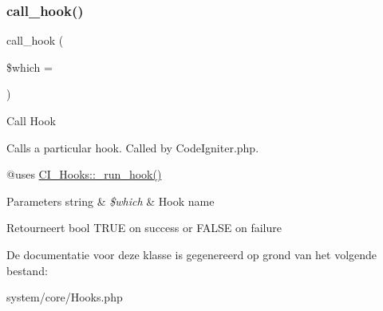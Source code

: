\subsubsection{\texorpdfstring{call\_hook()}{call\_hook()}}
{\footnotesize\ttfamily call\+\_\+hook (\begin{DoxyParamCaption}\item[{}]{\$which = {\ttfamily \textquotesingle{}\textquotesingle{}} }\end{DoxyParamCaption})}

Call Hook

Calls a particular hook. Called by Code\+Igniter.\+php.

@uses \mbox{\hyperlink{class_c_i___hooks_a2cd07b3fcfaf153a37f164d3fbc7c3d9}{C\+I\+\_\+\+Hooks\+::\+\_\+run\+\_\+hook()}}


\begin{DoxyParams}[1]{Parameters}
string & {\em \$which} & Hook name \\
\hline
\end{DoxyParams}
\begin{DoxyReturn}{Retourneert}
bool T\+R\+UE on success or F\+A\+L\+SE on failure 
\end{DoxyReturn}


De documentatie voor deze klasse is gegenereerd op grond van het volgende bestand\+:\begin{DoxyCompactItemize}
\item 
system/core/Hooks.\+php\end{DoxyCompactItemize}

